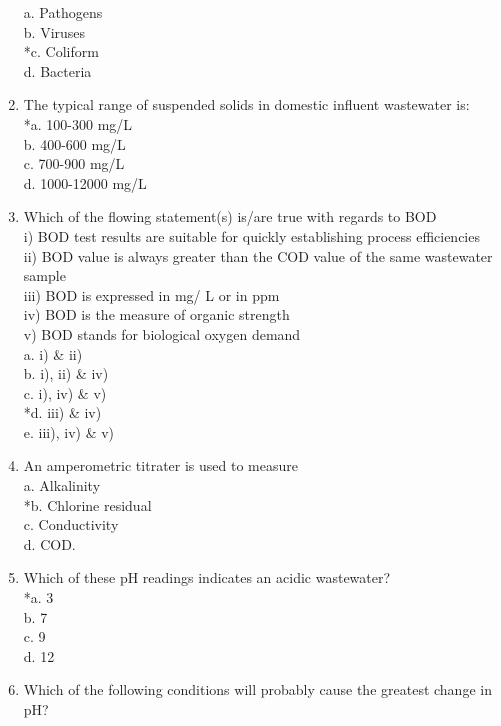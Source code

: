 \begin{enumerate}
a. Pathogens \\
b. Viruses \\
*c. Coliform \\
d. Bacteria 

\item The typical range of suspended solids in domestic influent wastewater is: \\

*a. 100-300 mg/L \\
b. 400-600 mg/L \\
c. 700-900 mg/L \\
d. 1000-12000 mg/L 

\item Which of the flowing statement(s) is/are true with regards to BOD\\
i) BOD test results are suitable for quickly establishing process efficiencies\\
ii) BOD value is always greater than the COD value of the same wastewater sample\\
iii) BOD is expressed in mg/ L or in ppm\\
iv) BOD is the measure of organic strength\\
v) BOD stands for biological oxygen demand \\

a. i) \& ii) \\
b. i), ii) \& iv) \\
c. i), iv) \& v) \\
*d. iii) \& iv) \\
e. iii), iv) \& v) 

\item An amperometric titrater is used to measure \\

a. Alkalinity \\
*b. Chlorine residual \\
c. Conductivity \\
d. COD. 

\item Which of these pH readings indicates an acidic wastewater? \\

*a. 3 \\
b. 7 \\
c. 9 \\
d. 12 

\item Which of the following conditions will probably cause the greatest change in pH? \\


\end{enumerate}
